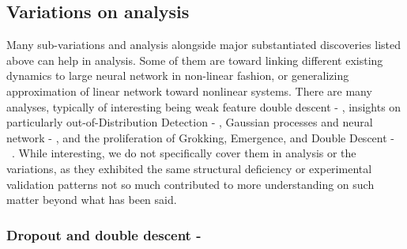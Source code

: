 \subsection{Variations on analysis}
Many sub-variations and analysis alongside major substantiated discoveries listed above can help in analysis. Some of them are toward linking different existing dynamics to large neural network in non-linear fashion, or generalizing approximation of linear network toward nonlinear systems. There are many analyses, typically of interesting being weak feature double descent - \cite{Belkin_2020}, insights on particularly out-of-Distribution Detection - \cite{ammar2025doubledescentmeetsoutofdistribution}, Gaussian processes and neural network - \cite{harzli2023doubledescentcurvesneuralnetworks}, and the proliferation of Grokking, Emergence, and Double Descent - ~\cite{huang2025samplecomplexityrepresentationability}. While interesting, we do not specifically cover them in analysis or the variations, as they exhibited the same structural deficiency or experimental validation patterns not so much contributed to more understanding on such matter beyond what has been said. 


\subsubsection{Dropout and double descent - \cite{Yang_2024}}

